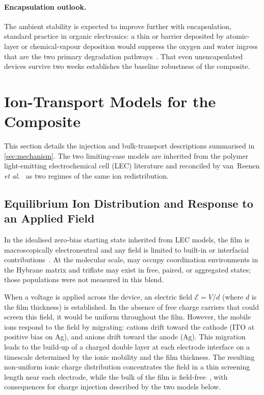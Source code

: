 \paragraph{Encapsulation outlook.} The ambient stability is expected to improve further with encapsulation, standard practice in organic electronics: a thin  or  barrier deposited by atomic-layer or chemical-vapour deposition would suppress the oxygen and water ingress that are the two primary degradation pathways~\cite{LewisWeaver2004}. That even unencapsulated devices survive two weeks establishes the baseline robustness of the composite.

\section{Ion-Transport Models for the Composite}\label{app:ch2_ion_models}

This section details the injection and bulk-transport descriptions summarised in \cref{sec:mechanism}. The two limiting-case models are inherited from the polymer light-emitting electrochemical cell (LEC) literature and reconciled by van~Reenen \textit{et al.}~\cite{vanReenen2010} as two regimes of the same ion redistribution.

\subsection{Equilibrium Ion Distribution and Response to an Applied Field}

In the idealised zero-bias starting state inherited from LEC models, the film is macroscopically electroneutral and any field is limited to built-in or interfacial contributions~\cite{Pei1995,deMello1998,vanReenen2010}. At the molecular scale,  may occupy coordination environments in the Hybrane matrix and triflate may exist in free, paired, or aggregated states; those populations were not measured in this blend.

When a voltage is applied across the device, an electric field $\mathcal{E} = V/d$ (where $d$ is the film thickness) is established. In the absence of free charge carriers that could screen this field, it would be uniform throughout the film. However, the mobile ions respond to the field by migrating: cations drift toward the cathode (ITO at positive bias on Ag), and anions drift toward the anode (Ag). This migration leads to the build-up of a charged double layer at each electrode interface on a timescale determined by the ionic mobility and the film thickness. The resulting non-uniform ionic charge distribution concentrates the field in a thin screening length near each electrode, while the bulk of the film is field-free~\cite{deMello1998,deMello2002}, with consequences for charge injection described by the two models below.


